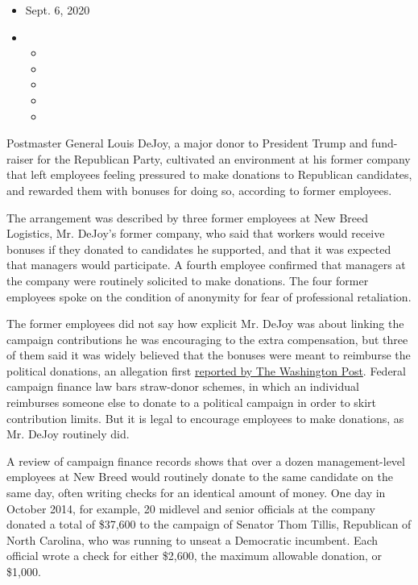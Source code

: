 \begin{itemize}
\item
  Sept. 6, 2020
\item
  \begin{itemize}
  \item
  \item
  \item
  \item
  \item
  \end{itemize}
\end{itemize}

Postmaster General Louis DeJoy, a major donor to President Trump and
fund-raiser for the Republican Party, cultivated an environment at his
former company that left employees feeling pressured to make donations
to Republican candidates, and rewarded them with bonuses for doing so,
according to former employees.

The arrangement was described by three former employees at New Breed
Logistics, Mr. DeJoy's former company, who said that workers would
receive bonuses if they donated to candidates he supported, and that it
was expected that managers would participate. A fourth employee
confirmed that managers at the company were routinely solicited to make
donations. The four former employees spoke on the condition of anonymity
for fear of professional retaliation.

The former employees did not say how explicit Mr. DeJoy was about
linking the campaign contributions he was encouraging to the extra
compensation, but three of them said it was widely believed that the
bonuses were meant to reimburse the political donations, an allegation
first
\href{https://www.washingtonpost.com/investigations/louis-dejoy-campaign-contributions/2020/09/06/1187bc2c-e3fe-11ea-8181-606e603bb1c4_story.html}{reported
by The Washington Post}. Federal campaign finance law bars straw-donor
schemes, in which an individual reimburses someone else to donate to a
political campaign in order to skirt contribution limits. But it is
legal to encourage employees to make donations, as Mr. DeJoy routinely
did.

A review of campaign finance records shows that over a dozen
management-level employees at New Breed would routinely donate to the
same candidate on the same day, often writing checks for an identical
amount of money. One day in October 2014, for example, 20 midlevel and
senior officials at the company donated a total of \$37,600 to the
campaign of Senator Thom Tillis, Republican of North Carolina, who was
running to unseat a Democratic incumbent. Each official wrote a check
for either \$2,600, the maximum allowable donation, or \$1,000.

